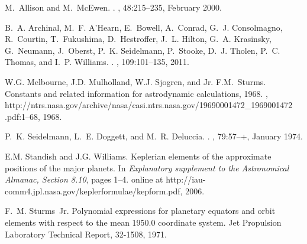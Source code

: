 \documentclass[draft]{article}
\begin{document}
\begin{thebibliography}{Seidelmann74ww}

M.~{Allison} and M.~{McEwen}.
.
, 48:215--235, February 2000.

B.~A. {Archinal}, M.~F. {A'Hearn}, E.~{Bowell}, A.~{Conrad}, G.~J.
  {Consolmagno}, R.~{Courtin}, T.~{Fukushima}, D.~{Hestroffer}, J.~L. {Hilton},
  G.~A. {Krasinsky}, G.~{Neumann}, J.~{Oberst}, P.~K. {Seidelmann},
  P.~{Stooke}, D.~J. {Tholen}, P.~C. {Thomas}, and I.~P. {Williams}.
.
, 109:101--135,
  2011.

W.G. Melbourne, J.D. Mulholland, W.J. Sjogren, and Jr. F.M.~Sturms.
\newblock Constants and related information for astrodynamic calculations,
  1968.
,
  http://ntrs.nasa.gov/archive/nasa/casi.ntrs.nasa.gov/19690001472\_1969001472%
.pdf:1--68, 1968.

P.~K. {Seidelmann}, L.~E. {Doggett}, and M.~R. {Deluccia}.
.
, 79:57--+, January 1974.

E.M. Standish and J.G. Williams.
\newblock Keplerian elements of the approximate positions of the major planets.
\newblock In {\em Explanatory supplement to the Astronomical Almanac, Section
  8.10}, pages 1--4. online at
  http://iau-comm4.jpl.nasa.gov/keplerformulae/kepform.pdf, 2006.

F.~M. Sturms~Jr.
\newblock Polynomial expressions for planetary equators and orbit elements with
  respect to the mean 1950.0 coordinate system.
\newblock Jet Propulsion Laboratory Technical Report, 32-1508, 1971.

\end{thebibliography}
\end{document}
